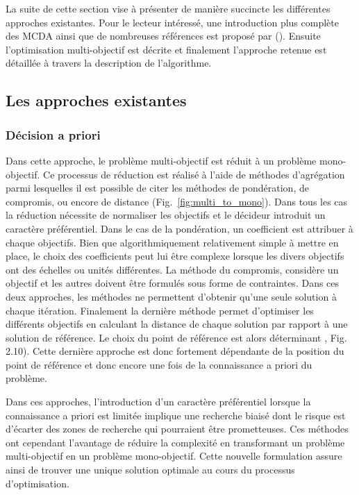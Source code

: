La suite de cette section vise à présenter de manière succincte les différentes
approches existantes. Pour le lecteur intéressé, une introduction plus complète
des MCDA ainsi que de nombreuses références est proposé par ().
Ensuite l’optimisation multi-objectif est décrite et finalement l’approche retenue
est détaillée à travers la description de l’algorithme.

\subsection{Les approches existantes} %
\label{sub:les_approches_existantes}
\subsubsection{Décision a priori} %
\label{ssub:decision_a_priori}
Dans cette approche, le problème multi-objectif est réduit à un problème mono-objectif.
Ce processus de réduction est réalisé à l’aide de méthodes d’agrégation parmi lesquelles
il est possible de citer les méthodes de pondération, de compromis,
ou encore de distance (Fig.~\ref{fig:multi_to_mono}). Dans tous les cas la réduction
nécessite de normaliser les objectifs et le décideur introduit un caractère préférentiel.
Dans le cas de la pondération, un coefficient est attribuer à chaque objectifs. Bien que
algorithmiquement relativement simple à mettre en place, le choix des coefficients peut
lui être complexe lorsque les divers objectifs ont des échelles ou unités différentes.
La méthode du compromis, considère un objectif et les autres doivent être formulés
sous forme de contraintes.
Dans ces deux approches, les méthodes ne permettent d’obtenir qu’une seule
solution à chaque itération.
Finalement la dernière méthode permet d’optimiser les différents objectifs en calculant
la distance de chaque solution par rapport à une solution de référence. Le choix
du point de référence est alors déterminant \parencite{Collette2002}, Fig. 2.10).
Cette dernière approche est donc fortement dépendante de la position du point de
référence et donc encore une fois de la connaissance a priori du problème.

Dans ces approches, l’introduction d’un caractère préférentiel lorsque la connaissance a priori
est limitée implique une recherche biaisé dont le risque est d’écarter des zones
de recherche qui pourraient être prometteuses. Ces méthodes ont cependant l’avantage
de réduire la complexité en transformant un problème multi-objectif en un problème
mono-objectif. Cette nouvelle formulation assure ainsi de trouver une unique solution
optimale au cours du processus d’optimisation.

